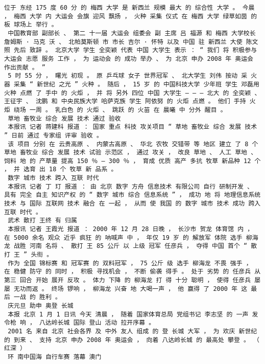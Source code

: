 \documentclass{article}
\begin{document}
\begin{Verbatim}[commandchars=\\\{\}]
 位于 东经 175 度 60 分 的 梅西 大学 是 新西兰 规模 最大 的 综合性 大学 。 今晨 ， 梅西 大学 内 大运会 会旗 迎风 飘扬 ， 火种 采集 仪式 在 梅西 大学 绿草如茵 的 板 球场上 举行 。 
 中国教育部 副部长 、 第二 十一届 大运会 组委会 副 主席 吕 福源 和 梅西 大学校长 詹姆斯 · 马克 沃 、 北帕莫斯顿 市 市长 吉尔 · 怀特 以及 中国 驻 新西兰 大使 陈文照 先后 致辞 。 北京大学 学生 全奕颖 代表 中国 大学生 表示 ： “ 我们 将 积极参与 大运会 志愿 服务 工作 ， 为 运动会 的 成功 举办 、 为 北京 申办 2008 年 奥运会 作出贡献 。 ” 
 5 时 55 分 ， 曙光 初现 。 原 乒乓球 女子 世界冠军 、 北大学生 刘伟 按动 采 火器 采集 “ 新世纪 之光 ” 火种 。 随后 ， 15 岁 的 中国科技大学 少年班 学生 邓磊用 火种 点燃 了 手中 的 火炬 ， 并 将 另外 四位 中国 大学生 — — — 北大 的 全奕颖 、 王征宇 、 沈鹏 和 中央民族大学 哈萨克族 学生 阿依努 的 火炬 点燃 。 他们 手持 火炬 绕场 一周 。 乳白色 的 火炬 、 跳跃 的 火苗 在 晨曦 中 分外 醒目 。 
 草地 畜牧业 综合 发展 技术 通过 验收 
 本报讯 记者 蒋建科 报道 ： 国家 重点 科技 攻关项目 “ 草地 畜牧业 综合 发展 技术 ” 日前 通过 专家组 评审 验收 。 
 该 项目 分别 在 云贵高原 、 内蒙古高原 、 华北 农牧 交错带 等 地区 建立 了 8 个 草地 畜牧业 综合 发展 技术 试验 示范区 ， 通过 攻关 ， 改良 草地 、 人工 草地 、 饲料 地 的 产草量 提高 150 ％ — 300 ％ ， 育成 优质 高产 多抗 牧草 新品种 12 个 ， 并 选育 出 18 个 牧草 新 品系 。 
 数字 城市 技术 跨入 互联 时代 
 本报讯 记者 丁 玎 报道 ： 由 北京 数字 方舟 信息技术 有限公司 自行 研制开发 、 具有 完全 自主 知识产权 的 “ 数字 城市 综合 信息系统 ” ， 成功 地 将 地理信息系统 技术 与 国际 互联网 技术 融合 在 一起 ， 从而 使 我国 的 数字 城市 技术 成功 跨入 互联 时代 。 
 武术 散打 王终 有 归属 
 本报讯 记者 王霞光 报道 ： 2000 年 12 月 28 日晚 ， 长沙市 贺龙 体育馆 内 ， 在 5000 余名 观众 近乎 疯狂 的 呐喊声 中 ， 年仅 19 岁 的 解放军 体院 选手 柳海龙 战胜 河南 名将 、 散打 王 85 公斤 以 上级 冠军 任彦兵 ， 夺得 中国 首个 “ 散打 王 ” 头衔 。 
 作为 全国 锦标赛 和 冠军赛 的 双料冠军 ， 75 公斤 级 选手 柳海龙 不畏 强手 ， 在 稳健 防守 的 同时 ， 积极 寻找机会 ， 不断 偷袭 得手 。 处于 劣势 的 任彦兵 从 第三 回合 开始 展开 反攻 。 体力 下降 的 柳海龙 打 得 十分 聪明 ， 使得 任彦兵 屡屡 无功而返 。 终场 锣响 ， 柳海龙 兴奋 地 大喝一声 ， 他 赢得 了 2000 年 这 最后 一战 的 胜利 。 
 庆元旦 助申 奥登 长城 
 本报 北京 1 月 1 日讯 今天 清晨 ， 随着 国家体育总局 党组书记 李志坚 的 一声 发令枪 响 ， 八达岭长城 国际 登山 活动 拉开序幕 。 
 2001 名 来自 北京 社会各界 及 中外 友人 组成 的 登 长城 大军 ， 为 欢庆 新世纪 的 到来 、 支持 北京 申办 2008 年 奥运会 ， 向着 八达岭长城 的 最高处 攀登 。 （ 红深 ） 
 环 南中国海 自行车赛 落幕 澳门 

\end{Verbatim}
\end{document}
